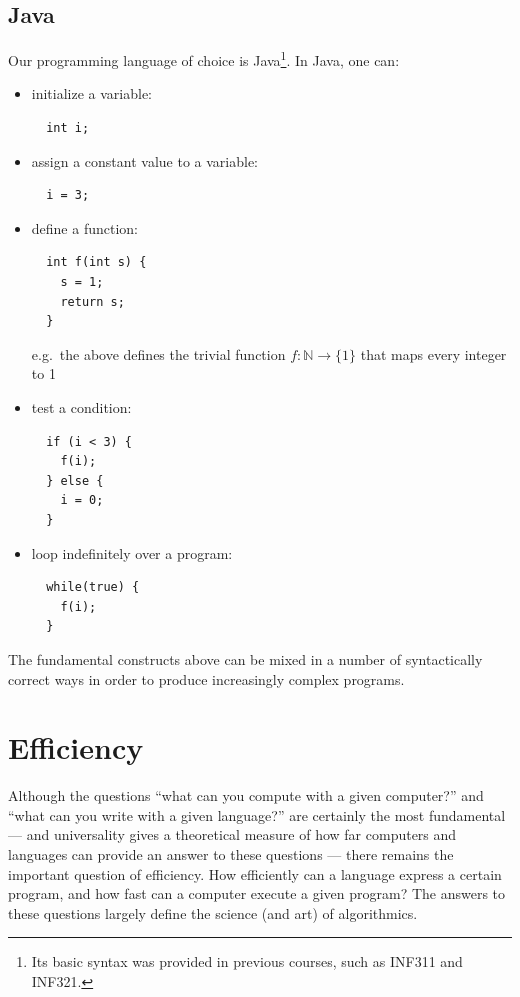 \documentclass[a4paper]{book}
\theoremstyle{changebreak}                %
\begin{document}
\subsection{Java}
\label{s:computation:java}
Our programming language of choice is Java\footnote{Its basic syntax
  was provided in previous courses, such as INF311 and
  INF321.}. In Java, one can:
\begin{itemize}
\item initialize a variable:
\begin{verbatim}
  int i;
\end{verbatim}
\item assign a constant value to a variable:
\begin{verbatim}
  i = 3;
\end{verbatim}
\item define a function:
\begin{verbatim}
  int f(int s) {
    s = 1;
    return s;
  }
\end{verbatim}
e.g.~the above defines the trivial function $f:\mathbb{N}\to\{1\}$
that maps every integer to 1
\item test a condition:
\begin{verbatim}
  if (i < 3) {
    f(i);
  } else {
    i = 0;
  }
\end{verbatim}
\item loop indefinitely over a program:
\begin{verbatim}
  while(true) {
    f(i);
  }
\end{verbatim}
\end{itemize}
The fundamental constructs above can be mixed in a number of
syntactically correct ways in order to produce increasingly complex
programs.

\section{Efficiency}
\label{s:computation:efficiency}
Although the questions ``what can you compute with a given computer?''
and ``what can you write with a given language?'' are certainly the
most fundamental --- and universality gives a
theoretical measure of how far computers and languages can provide an
answer to these questions --- there remains the important question of
efficiency. How efficiently can a language express a
certain program, and how fast can a computer execute a given program?
The answers to these questions largely define the science (and art) of
algorithmics.
\end{document}
